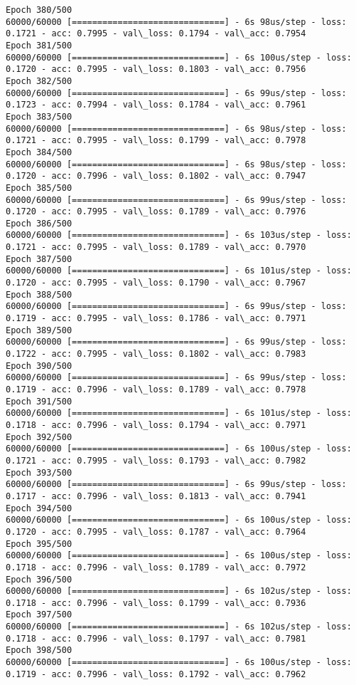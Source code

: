 \documentclass[11pt]{article}
\begin{document}
\begin{Verbatim}[commandchars=\\\{\}]
Epoch 380/500
60000/60000 [==============================] - 6s 98us/step - loss: 0.1721 - acc: 0.7995 - val\_loss: 0.1794 - val\_acc: 0.7954
Epoch 381/500
60000/60000 [==============================] - 6s 100us/step - loss: 0.1720 - acc: 0.7995 - val\_loss: 0.1803 - val\_acc: 0.7956
Epoch 382/500
60000/60000 [==============================] - 6s 99us/step - loss: 0.1723 - acc: 0.7994 - val\_loss: 0.1784 - val\_acc: 0.7961
Epoch 383/500
60000/60000 [==============================] - 6s 98us/step - loss: 0.1721 - acc: 0.7995 - val\_loss: 0.1799 - val\_acc: 0.7978
Epoch 384/500
60000/60000 [==============================] - 6s 98us/step - loss: 0.1720 - acc: 0.7996 - val\_loss: 0.1802 - val\_acc: 0.7947
Epoch 385/500
60000/60000 [==============================] - 6s 99us/step - loss: 0.1720 - acc: 0.7995 - val\_loss: 0.1789 - val\_acc: 0.7976
Epoch 386/500
60000/60000 [==============================] - 6s 103us/step - loss: 0.1721 - acc: 0.7995 - val\_loss: 0.1789 - val\_acc: 0.7970
Epoch 387/500
60000/60000 [==============================] - 6s 101us/step - loss: 0.1720 - acc: 0.7995 - val\_loss: 0.1790 - val\_acc: 0.7967
Epoch 388/500
60000/60000 [==============================] - 6s 99us/step - loss: 0.1719 - acc: 0.7995 - val\_loss: 0.1786 - val\_acc: 0.7971
Epoch 389/500
60000/60000 [==============================] - 6s 99us/step - loss: 0.1722 - acc: 0.7995 - val\_loss: 0.1802 - val\_acc: 0.7983
Epoch 390/500
60000/60000 [==============================] - 6s 99us/step - loss: 0.1719 - acc: 0.7996 - val\_loss: 0.1789 - val\_acc: 0.7978
Epoch 391/500
60000/60000 [==============================] - 6s 101us/step - loss: 0.1718 - acc: 0.7996 - val\_loss: 0.1794 - val\_acc: 0.7971
Epoch 392/500
60000/60000 [==============================] - 6s 100us/step - loss: 0.1721 - acc: 0.7995 - val\_loss: 0.1793 - val\_acc: 0.7982
Epoch 393/500
60000/60000 [==============================] - 6s 99us/step - loss: 0.1717 - acc: 0.7996 - val\_loss: 0.1813 - val\_acc: 0.7941
Epoch 394/500
60000/60000 [==============================] - 6s 100us/step - loss: 0.1720 - acc: 0.7995 - val\_loss: 0.1787 - val\_acc: 0.7964
Epoch 395/500
60000/60000 [==============================] - 6s 100us/step - loss: 0.1718 - acc: 0.7996 - val\_loss: 0.1789 - val\_acc: 0.7972
Epoch 396/500
60000/60000 [==============================] - 6s 102us/step - loss: 0.1718 - acc: 0.7996 - val\_loss: 0.1799 - val\_acc: 0.7936
Epoch 397/500
60000/60000 [==============================] - 6s 102us/step - loss: 0.1718 - acc: 0.7996 - val\_loss: 0.1797 - val\_acc: 0.7981
Epoch 398/500
60000/60000 [==============================] - 6s 100us/step - loss: 0.1719 - acc: 0.7996 - val\_loss: 0.1792 - val\_acc: 0.7962

\end{Verbatim}
\end{document}
